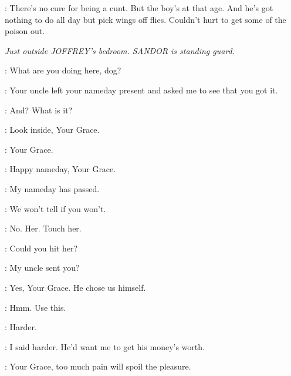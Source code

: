 \BRONN: There's no cure for being a cunt. But the boy's at that age. And he's got nothing to do all day but pick wings off flies. Couldn't hurt to get some of the poison out. 


\scene

\textit{Just outside JOFFREY's bedroom. SANDOR is standing guard.} 

\JOFFREY: What are you doing here, dog? 

\HOUND: Your uncle left your nameday present and asked me to see that you got it. 

\JOFFREY: And? What is it? 

\HOUND: Look inside, Your Grace. 


\DAISY: Your Grace. 

\ROS: Happy nameday, Your Grace. 

\JOFFREY: My nameday has passed. 

\ROS: We won't tell if you won't. 


\JOFFREY: No. Her. Touch her. 


\JOFFREY: Could you hit her? 


\JOFFREY: My uncle sent you? 

\ROS: Yes, Your Grace. He chose us himself. 

\JOFFREY: Hmm. Use this. 


\JOFFREY: Harder. 


\JOFFREY: I said harder. He'd want me to get his money's worth. 



\ROS: Your Grace, too much pain will spoil the pleasure. 


